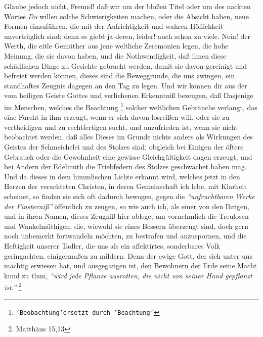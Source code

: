 Glaube jedoch nicht, Freund! daß wir um der bloßen Titel oder um des nackten
Wortes \textit{Du} willen solche Schwierigkeiten machen, oder die Absicht haben,
neue
Formen einzuführen, die mit der Aufrichtigkeit und wahren Höflichkeit
unverträglich sind; denn es giebt ja deren, leider! auch schon zu viele. Nein!
der Werth, die eitle Gemüther aus jene weltliche Zeremonien legen, die hohe
Meinung, die sie davon haben, und die Nothwendigkeit, daß ihnen diese
schädlichen Dinge zu Gesichte gebracht werden, damit sie davon gereinigt und
befreiet werden  können, dieses sind die Beweggründe, die uns zwingen, ein
standhaftes Zeugnis dagegen an den Tag zu legen. Und wir können
dir aus der vom
heiligen Geiste Gottes und verliehenen Erkenntniß bezeugen, daß Dasjenige im
Menschen, welches die Beachtung
\footnote{\texttt{'Beobachtung'ersetzt durch 'Beachtung'}} solcher weltlichen
Gebräuche verlangt, das
eine Furcht in ihm erzeugt, wenn er sich davon losreißen will, oder sie zu
vertheidigen und zu rechtfertigen sucht, und unzufrieden ist, wenn sie nicht
beobachtet werden, daß alles Dieses im Grunde nichts anders als Wirkungen des
Geistes der Schmeichelei und des Stolzes sind; obgleich bei Einigen der öftere
Gebrauch oder die Gewohnheit eine gewisse Gleichgültigkeit dagen erzeugt, und
bei Andern der Edelmuth die Triebfedern des Stolzes geschwächet haben mag. Und
da dieses in dem himmlischen Lichte erkannt wird, welches jetzt in den Herzen
der verachteten Christen, in deren Gemeinschaft ich lebe, mit Klarheit scheinet,
so finden sie sich oft dadurch bewogen, gegen die \textit{"`unfruchtbaren Werke
der
Finsterniß"'} öffentlich zu zeugen, so wie auch ich, als einer
von den Ihrigen,
und in ihren Namen, dieses Zeugniß hier ablege, um vornehmlich die Treulosen und
Wankelmüthigen, die, wiewohl sie eines Bessern überzeugt sind, doch gern noch
unbemerkt fortwandeln möchten, zu bestrafen und anzuspornen, und die Heftigkeit
unserer Tadler, die uns als ein affektirtes, sonderbares Volk geringachten,
einigermaßen zu mildern. Denn der ewige Gott, der sich unter uns mächtig
erwiesen hat, und ausgegangen ist, den Bewohnern der Erde seine Macht kund zu
thun,
\textit{"`wird jede Pflanze ausrotten, die nicht von seiner Hand gepflanzt
ist."'}
\footnote{Matthäus 15,13}

\medskip

